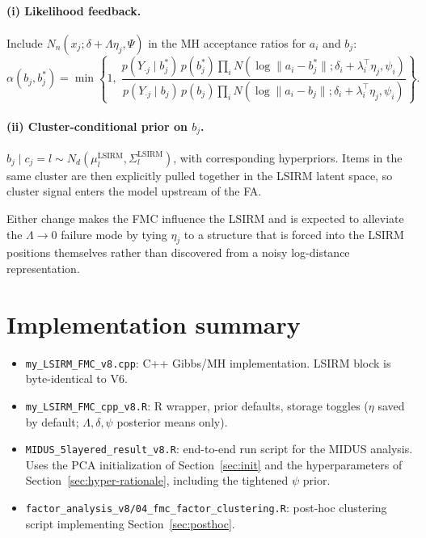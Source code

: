 \documentclass[11pt]{article}
\begin{document}
\paragraph{(i) Likelihood feedback.}
Include $N_n(x_j;\delta+\Lambda\eta_j,\Psi)$ in the MH acceptance ratios for $a_i$ and $b_j$:
\[
\alpha(b_j,b_j^\ast)
=
\min\left\{1,\;
\frac{p(Y_{\cdot j}\mid b_j^\ast)\,p(b_j^\ast)\prod_i N(\log\|a_i-b_j^\ast\|;\delta_i+\lambda_i^\top\eta_j,\psi_i)}
{p(Y_{\cdot j}\mid b_j)\,p(b_j)\prod_i N(\log\|a_i-b_j\|;\delta_i+\lambda_i^\top\eta_j,\psi_i)}
\right\}.
\]

\paragraph{(ii) Cluster-conditional prior on $b_j$.}
$b_j\mid c_j=l\sim N_d(\mu_l^{\mathrm{LSIRM}},\Sigma_l^{\mathrm{LSIRM}})$, with corresponding hyperpriors. Items in the same cluster are then explicitly pulled together in the LSIRM latent space, so cluster signal enters the model upstream of the FA.

Either change makes the FMC influence the LSIRM and is expected to alleviate the $\Lambda\to 0$ failure mode by tying $\eta_j$ to a structure that is forced into the LSIRM positions themselves rather than discovered from a noisy log-distance representation.

\section{Implementation summary}

\begin{itemize}[leftmargin=1.5em]
    \item \texttt{my\_LSIRM\_FMC\_v8.cpp}: C++ Gibbs/MH implementation. LSIRM block is byte-identical to V6.
    \item \texttt{my\_LSIRM\_FMC\_cpp\_v8.R}: R wrapper, prior defaults, storage toggles ($\eta$ saved by default; $\Lambda,\delta,\psi$ posterior means only).
    \item \texttt{MIDUS\_5layered\_result\_v8.R}: end-to-end run script for the MIDUS analysis. Uses the PCA initialization of Section~\ref{sec:init} and the hyperparameters of Section~\ref{sec:hyper-rationale}, including the tightened $\psi$ prior.
    \item \texttt{factor\_analysis\_v8/04\_fmc\_factor\_clustering.R}: post-hoc clustering script implementing Section~\ref{sec:posthoc}.
\end{itemize}
\end{document}
